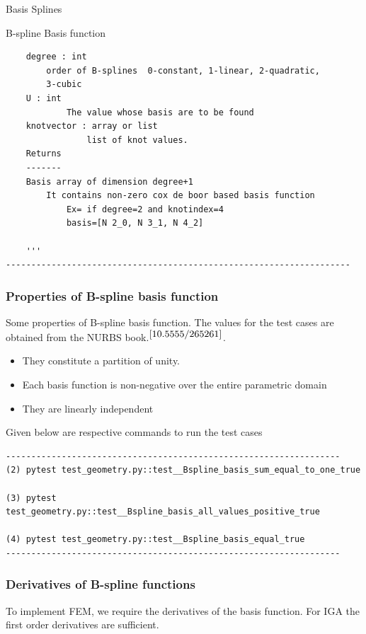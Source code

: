 \documentclass[a4paper,12pt,times]{article}
\begin{document}
\begin{section}{Basis Splines}
\begin{subsection}{B-spline Basis function}
\begin{verbatim}
    degree : int
        order of B-splines  0-constant, 1-linear, 2-quadratic, 
        3-cubic
    U : int
            The value whose basis are to be found
    knotvector : array or list
            	list of knot values.
    Returns
    -------
    Basis array of dimension degree+1
        It contains non-zero cox de boor based basis function
            Ex= if degree=2 and knotindex=4 
            basis=[N 2_0, N 3_1, N 4_2]

    '''
--------------------------------------------------------------------
\end{verbatim}
\subsubsection{Properties of B-spline basis function}

Some properties of B-spline basis function. The values for the test cases are obtained from the NURBS book.$^{\cite{10.5555/265261}}$.
\begin{itemize}
\item They constitute a partition of unity.


\item Each basis function is non-negative over the entire parametric domain

\item They are linearly independent
\end{itemize}
Given below are respective commands to run the test cases
\begin{verbatim} 
------------------------------------------------------------------
(2) pytest test_geometry.py::test__Bspline_basis_sum_equal_to_one_true

(3) pytest test_geometry.py::test__Bspline_basis_all_values_positive_true

(4) pytest test_geometry.py::test__Bspline_basis_equal_true
------------------------------------------------------------------
\end{verbatim}

\subsubsection{Derivatives of B-spline functions}
To implement FEM, we require the derivatives of the basis function. For IGA the first order derivatives are sufficient.


\end{subsection}
\end{section}
\end{document}
